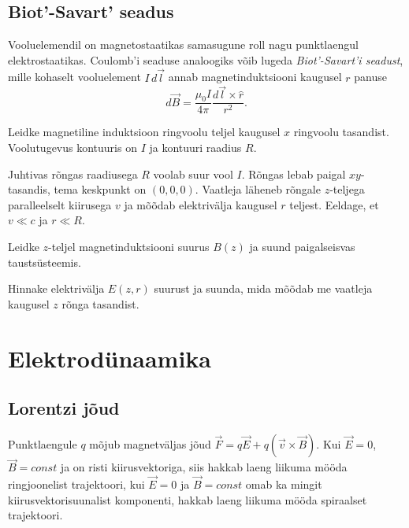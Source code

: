 \documentclass[a4paper,11pt,twocolumn]{article}
\begin{document}
\subsection{Biot'-Savart' seadus}
Vooluelemendil on magnetostaatikas samasugune roll nagu punktlaengul elektrostaatikas. Coulomb’i seaduse analoogiks võib lugeda \textit{Biot’-Savart’i seadust}, mille kohaselt vooluelement \( I\, d\vec{l} \) annab magnetinduktsiooni kaugusel \( r \) panuse
\begin{equation}
    d\vec{B}=\dfrac{\mu_0 I}{4\pi}\dfrac{d\vec{l} \times \hat{r}}{r^2} \tag{Biot'-Savart' seadus}.
\end{equation}

\begin{question}
    Leidke magnetiline induktsioon ringvoolu teljel kaugusel \( x \) ringvoolu tasandist. Voolutugevus kontuuris on \( I \) ja kontuuri raadius \( R \).
\end{question}

\begin{question}[E-S 2015, P8]
    Juhtivas rõngas raadiusega \(R\) voolab suur vool \(I\). Rõngas lebab paigal \(xy\)-tasandis, tema keskpunkt on \( (0,0,0) \). Vaatleja läheneb rõngale \(z\)-teljega paralleelselt kiirusega \(v\) ja mõõdab elektrivälja kaugusel \(r\) teljest. Eeldage, et \(v \ll c\) ja \(r \ll R\).
    \begin{subquestion}
    \item Leidke \(z\)-teljel magnetinduktsiooni suurus \(B(z)\) ja suund paigalseisvas taustsüsteemis.
    \item Hinnake elektrivälja \(E(z,r)\) suurust ja suunda, mida mõõdab me vaatleja kaugusel \(z\) rõnga tasandist.
    \end{subquestion}
\end{question}

\section{Elektrodünaamika}
\subsection{Lorentzi jõud}
Punktlaengule $q$ mõjub magnetväljas jõud $\vec{F}=q\vec{E}+q(\vec{v}\times \vec{B})$. Kui $\vec{E}=0$, \( \vec{B}=const \) ja on risti kiirusvektoriga, siis hakkab laeng liikuma mööda ringjoonelist trajektoori, kui $\vec{E}=0$ ja $\vec{B}=const$ omab ka mingit kiirusvektorisuunalist komponenti, hakkab laeng liikuma mööda spiraalset trajektoori.
\end{document}
